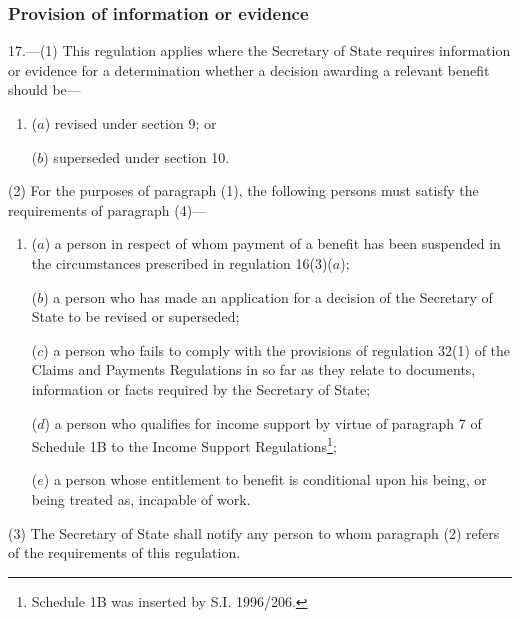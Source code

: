 \documentclass[12pt,a4paper]{article}
\begin{document}
\subsubsection[17. Provision of information or evidence]{Provision of information or evidence}

17.—(1) This regulation applies where the Secretary of State requires information or evidence for a determination whether a decision awarding a relevant benefit should be—
\begin{enumerate}\item[]
($a$) revised under section 9; or

($b$) superseded under section 10.
\end{enumerate}

(2) For the purposes of paragraph (1), the following persons must satisfy the requirements of paragraph (4)—
\begin{enumerate}\item[]
($a$) a person in respect of whom payment of a benefit has been suspended in the circumstances prescribed in regulation 16(3)($a$);

($b$) a person who has made an application for a decision of the Secretary of State to be revised or superseded;

($c$) a person who fails to comply with the provisions of regulation 32(1) of the Claims and Payments Regulations in so far as they relate to documents, information or facts required by the Secretary of State;

($d$) a person who qualifies for income support by virtue of paragraph 7 of Schedule 1B to the Income Support Regulations\footnote{\frenchspacing Schedule 1B was inserted by S.I. 1996/206.};

($e$) a person whose entitlement to benefit is conditional upon his being, or being treated as, incapable of work.
\end{enumerate}

(3) The Secretary of State shall notify any person to whom paragraph (2) refers of the requirements of this regulation.
\end{document}
